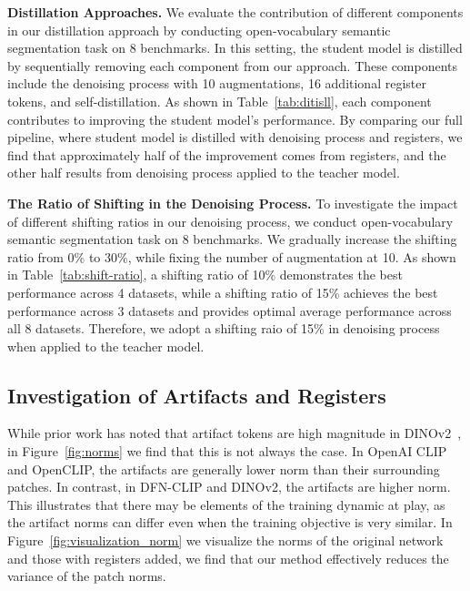 
\textbf{Distillation Approaches.} We evaluate the contribution of different components in our distillation approach by conducting open-vocabulary semantic segmentation task on 8 benchmarks. In this setting, the student model is distilled by sequentially removing each component from our approach. These components include the denoising process with 10 augmentations, 16 additional register tokens, and self-distillation.
As shown in Table~\ref{tab:ditisll}, each component contributes to improving the student model's performance. By comparing our full pipeline, where student model is distilled with denoising process and registers, we find that approximately half of the improvement comes from registers, and the other half results from denoising process applied to the teacher model.


\textbf{The Ratio of Shifting in the Denoising Process.} To investigate the impact of different shifting ratios in our denoising process, we conduct open-vocabulary semantic segmentation task on 8 benchmarks.
We gradually increase the shifting ratio from 0\% to 30\%, while fixing the number of augmentation at 10. As shown in Table~\ref{tab:shift-ratio}, a shifting ratio of 10\% demonstrates the best performance across 4 datasets, while a shifting ratio of 15\% achieves the best performance across 3 datasets and provides optimal average performance across all 8 datasets. Therefore, we adopt a shifting raio of 15\% in denoising process when applied to the teacher model.

\subsection{Investigation of Artifacts and Registers}
While prior work has noted that artifact tokens are high magnitude in DINOv2~\cite{darcet2023vision}, in Figure~\ref{fig:norms} we find that this is not always the case. In OpenAI CLIP and OpenCLIP, the artifacts are generally lower norm than their surrounding patches. In contrast, in DFN-CLIP and DINOv2, the artifacts are higher norm. This illustrates that there may be elements of the training dynamic at play, as the artifact norms can differ even when the training objective is very similar. In Figure~\ref{fig:visualization_norm} we visualize the norms of the original network and those with registers added, we find that our method effectively reduces the variance of the patch norms. 